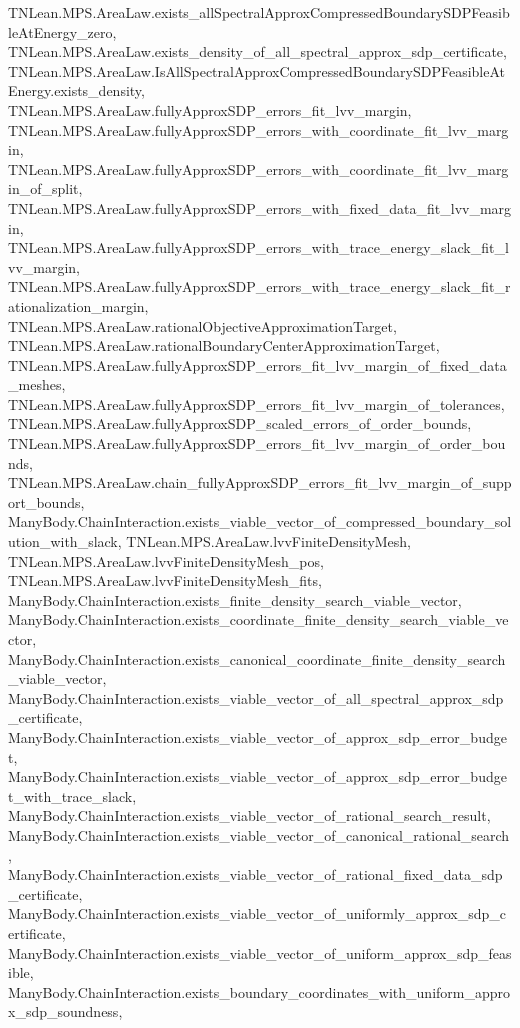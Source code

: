 \begin{lemma}
{        TNLean.MPS.AreaLaw.exists_allSpectralApproxCompressedBoundarySDPFeasibleAtEnergy_zero,
        TNLean.MPS.AreaLaw.exists_density_of_all_spectral_approx_sdp_certificate,
        TNLean.MPS.AreaLaw.IsAllSpectralApproxCompressedBoundarySDPFeasibleAtEnergy.exists_density,
        TNLean.MPS.AreaLaw.fullyApproxSDP_errors_fit_lvv_margin,
        TNLean.MPS.AreaLaw.fullyApproxSDP_errors_with_coordinate_fit_lvv_margin,
        TNLean.MPS.AreaLaw.fullyApproxSDP_errors_with_coordinate_fit_lvv_margin_of_split,
        TNLean.MPS.AreaLaw.fullyApproxSDP_errors_with_fixed_data_fit_lvv_margin,
        TNLean.MPS.AreaLaw.fullyApproxSDP_errors_with_trace_energy_slack_fit_lvv_margin,
        TNLean.MPS.AreaLaw.fullyApproxSDP_errors_with_trace_energy_slack_fit_rationalization_margin,
        TNLean.MPS.AreaLaw.rationalObjectiveApproximationTarget,
        TNLean.MPS.AreaLaw.rationalBoundaryCenterApproximationTarget,
        TNLean.MPS.AreaLaw.fullyApproxSDP_errors_fit_lvv_margin_of_fixed_data_meshes,
        TNLean.MPS.AreaLaw.fullyApproxSDP_errors_fit_lvv_margin_of_tolerances,
        TNLean.MPS.AreaLaw.fullyApproxSDP_scaled_errors_of_order_bounds,
        TNLean.MPS.AreaLaw.fullyApproxSDP_errors_fit_lvv_margin_of_order_bounds,
        TNLean.MPS.AreaLaw.chain_fullyApproxSDP_errors_fit_lvv_margin_of_support_bounds,
        ManyBody.ChainInteraction.exists_viable_vector_of_compressed_boundary_solution_with_slack,
        TNLean.MPS.AreaLaw.lvvFiniteDensityMesh,
        TNLean.MPS.AreaLaw.lvvFiniteDensityMesh_pos,
        TNLean.MPS.AreaLaw.lvvFiniteDensityMesh_fits,
        ManyBody.ChainInteraction.exists_finite_density_search_viable_vector,
        ManyBody.ChainInteraction.exists_coordinate_finite_density_search_viable_vector,
        ManyBody.ChainInteraction.exists_canonical_coordinate_finite_density_search_viable_vector,
        ManyBody.ChainInteraction.exists_viable_vector_of_all_spectral_approx_sdp_certificate,
        ManyBody.ChainInteraction.exists_viable_vector_of_approx_sdp_error_budget,
        ManyBody.ChainInteraction.exists_viable_vector_of_approx_sdp_error_budget_with_trace_slack,
        ManyBody.ChainInteraction.exists_viable_vector_of_rational_search_result,
        ManyBody.ChainInteraction.exists_viable_vector_of_canonical_rational_search,
        ManyBody.ChainInteraction.exists_viable_vector_of_rational_fixed_data_sdp_certificate,
        ManyBody.ChainInteraction.exists_viable_vector_of_uniformly_approx_sdp_certificate,
        ManyBody.ChainInteraction.exists_viable_vector_of_uniform_approx_sdp_feasible,
        ManyBody.ChainInteraction.exists_boundary_coordinates_with_uniform_approx_sdp_soundness,
}
\end{lemma}
